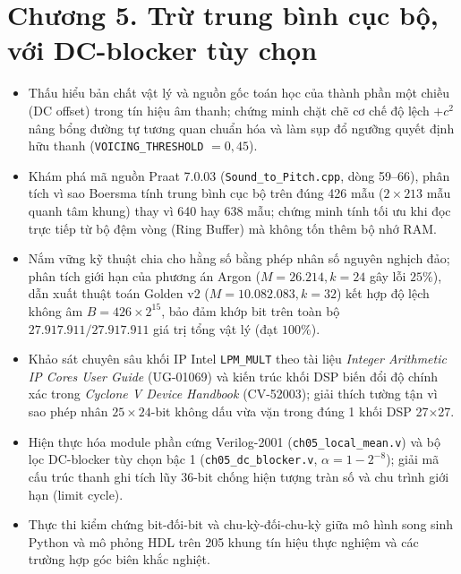 \providecommand{\todo}[1]{\textcolor{red}{\textbf{[TODO: #1]}}}
\clearpage
{}
\section*{Chương 5. Trừ trung bình cục bộ, với DC-blocker tùy chọn}

\begin{learningobj}
\begin{itemize}[leftmargin=1.5em, itemsep=2pt]
    \item Thấu hiểu bản chất vật lý và nguồn gốc toán học của thành phần một chiều (DC offset) trong tín hiệu âm thanh; chứng minh chặt chẽ cơ chế độ lệch $+c^2$ nâng bổng đường tự tương quan chuẩn hóa và làm sụp đổ ngưỡng quyết định hữu thanh (\texttt{VOICING\_THRESHOLD} $= 0{,}45$).
    \item Khám phá mã nguồn Praat 7.0.03 (\texttt{Sound\_to\_Pitch.cpp}, dòng 59--66), phân tích vì sao Boersma tính trung bình cục bộ trên đúng 426 mẫu ($2 \times 213$ mẫu quanh tâm khung) thay vì 640 hay 638 mẫu; chứng minh tính tối ưu khi đọc trực tiếp từ bộ đệm vòng (Ring Buffer) mà không tốn thêm bộ nhớ RAM.
    \item Nắm vững kỹ thuật chia cho hằng số bằng phép nhân số nguyên nghịch đảo; phân tích giới hạn của phương án Argon ($M = 26.214, k = 24$ gây lỗi $25\%$), dẫn xuất thuật toán Golden v2 ($M = 10.082.083, k = 32$) kết hợp độ lệch không âm $B = 426 \times 2^{15}$, bảo đảm khớp bit trên toàn bộ $27.917.911 / 27.917.911$ giá trị tổng vật lý (đạt $100\%$).
    \item Khảo sát chuyên sâu khối IP Intel \texttt{LPM\_MULT} theo tài liệu \emph{Integer Arithmetic IP Cores User Guide} (UG-01069) và kiến trúc khối DSP biến đổi độ chính xác trong \emph{Cyclone V Device Handbook} (CV-52003); giải thích tường tận vì sao phép nhân $25 \times 24$-bit không dấu vừa vặn trong đúng 1 khối DSP 27$\times$27.
    \item Hiện thực hóa module phần cứng Verilog-2001 (\texttt{ch05\_local\_mean.v}) và bộ lọc DC-blocker tùy chọn bậc 1 (\texttt{ch05\_dc\_blocker.v}, $\alpha = 1 - 2^{-8}$); giải mã cấu trúc thanh ghi tích lũy 36-bit chống hiện tượng tràn số và chu trình giới hạn (limit cycle).
    \item Thực thi kiểm chứng bit-đối-bit và chu-kỳ-đối-chu-kỳ giữa mô hình song sinh Python và mô phỏng HDL trên 205 khung tín hiệu thực nghiệm và các trường hợp góc biên khắc nghiệt.
\end{itemize}
\end{learningobj}

